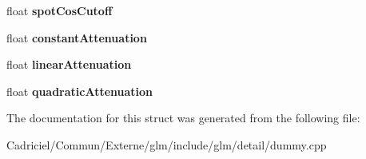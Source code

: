 \begin{DoxyCompactItemize}
\item 
float {\bfseries spot\+Cos\+Cutoff}\hypertarget{structlight_a25376f0a1e32235d50ef14edfa18bfb3}{}\label{structlight_a25376f0a1e32235d50ef14edfa18bfb3}

\item 
float {\bfseries constant\+Attenuation}\hypertarget{structlight_a788e3a9fbc05cd748dd6a181b6043892}{}\label{structlight_a788e3a9fbc05cd748dd6a181b6043892}

\item 
float {\bfseries linear\+Attenuation}\hypertarget{structlight_aea11b1222a4d5c42f5d69e31751e6fac}{}\label{structlight_aea11b1222a4d5c42f5d69e31751e6fac}

\item 
float {\bfseries quadratic\+Attenuation}\hypertarget{structlight_afe2993ec0463d57b374b8f5a27f2dfa7}{}\label{structlight_afe2993ec0463d57b374b8f5a27f2dfa7}

\end{DoxyCompactItemize}


The documentation for this struct was generated from the following file\+:\begin{DoxyCompactItemize}
\item 
Cadriciel/\+Commun/\+Externe/glm/include/glm/detail/dummy.\+cpp\end{DoxyCompactItemize}
